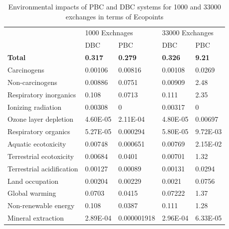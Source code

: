 \documentclass[conference]{IEEEtran}
\begin{document}
\begin{table}[h]
\caption{Environmental impacts of PBC and DBC systems for 1000 and 33000 exchanges in terms of Ecopoints}
\centering
\begin{tabular}{ll|l|l|l|l|}
\cline{3-6}
\multicolumn{2}{l}{\multirow{2}{*}{\textbf{}}} & \multicolumn{2}{|l|}{1000 Exchnages} & \multicolumn{2}{l|}{33000 Exchanges} \\ \cline{3-6} 
\multicolumn{2}{l|}{} & DBC & PBC & DBC & PBC \\ \hline
\multicolumn{2}{|l|}{\textbf{Total}} & \textbf{0.317} & \textbf{0.279} & \textbf{0.326} & \textbf{9.21} \\ \hline
\multicolumn{2}{|l|}{Carcinogens} & 0.00106 & 0.00816 & 0.00108 & 0.0269 \\ \hline
\multicolumn{2}{|l|}{Non-carcinogens} & 0.00886 & 0.0751 & 0.00909 & 2.48 \\ \hline
\multicolumn{2}{|l|}{Respiratory inorganics} & 0.108 & 0.0713 & 0.111 & 2.35 \\ \hline
\multicolumn{2}{|l|}{Ionizing radiation} & 0.00308 & 0 & 0.00317 & 0 \\ \hline
\multicolumn{2}{|l|}{Ozone layer depletion} & 4.60E-05 & 2.11E-04 & 4.80E-05 & 0.00697 \\ \hline
\multicolumn{2}{|l|}{Respiratory organics} & 5.27E-05 & 0.000294 & 5.80E-05 & 9.72E-03 \\ \hline
\multicolumn{2}{|l|}{Aquatic ecotoxicity} & 0.00748 & 0.000651 & 0.00769 & 2.15E-02 \\ \hline
\multicolumn{2}{|l|}{Terrestrial ecotoxicity} & 0.00684 & 0.0401 & 0.00701 & 1.32 \\ \hline
\multicolumn{2}{|l|}{Terrestrial acidification} & 0.00127 & 0.00089 & 0.00131 & 0.0294 \\ \hline
\multicolumn{2}{|l|}{Land occupation} & 0.00204 & 0.00229 & 0.0021 & 0.0756 \\ \hline
\multicolumn{2}{|l|}{Global warming} & 0.0703 & 0.0415 & 0.07222 & 1.37 \\ \hline
\multicolumn{2}{|l|}{Non-renewable energy} & 0.108 & 0.0387 & 0.111 & 1.28 \\ \hline
\multicolumn{2}{|l|}{Mineral extraction} & 2.89E-04 & 0.000001918 & 2.96E-04 & 6.33E-05 \\ \hline
\end{tabular}
\label{PBCandDBCexchanges}
\end{table}
\end{document}
